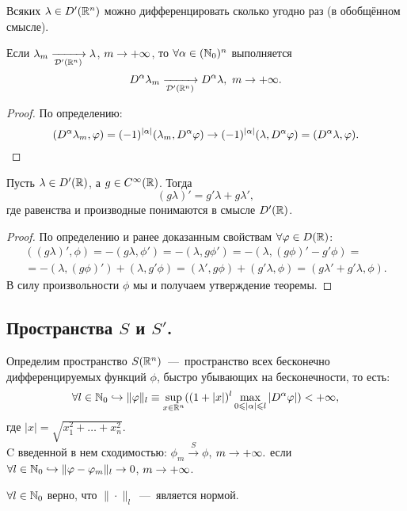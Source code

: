 \begin{note}
    Всяких $\lambda \in D'(\mathbb{R}^n)$ можно дифференцировать сколько угодно раз (в обобщённом смысле).
\end{note}
\begin{lemma}
    Если $\lambda_m \xrightarrow[\mathcal{D}'(\mathbb{R}^n)]{} \lambda$, $m \rightarrow +\infty$, то $\forall \alpha \in (\mathbb{N}_0)^n$ выполняется
    \[
        D^{\alpha} \lambda_m \xrightarrow[\mathcal{D}'(\mathbb{R}^n)]{} D^{\alpha} \lambda,\  m \rightarrow +\infty.
    \]
\end{lemma}
\begin{proof}
    По определению:
    \[
        (D^{\alpha} \lambda_m, \varphi) = (-1)^{|\alpha|} (\lambda_m, D^{\alpha} \varphi) \rightarrow (-1)^{|\alpha|}(\lambda, D^{\alpha}\varphi) = (D^{\alpha} \lambda, \varphi).
    \]
\end{proof}
\begin{theorem}
    Пусть $\lambda \in D'(\mathbb{R})$, а $g \in C^\infty(\mathbb{R})$.
    Тогда
    \[
        (g\lambda)' = g' \lambda + g \lambda',
    \]
    где равенства и производные понимаются в смысле $D'(\mathbb{R})$.
\end{theorem}
\begin{proof}
    По определению и ранее доказанным свойствам $\forall \varphi \in D(\mathbb{R})$:
    \begin{multline*}
        ((g\lambda)', \phi) = -(g \lambda, \phi') = -(\lambda, g \phi') = -(\lambda, (g\phi)' - g'\phi) = \\ = -(\lambda, (g\phi)') + (\lambda, g' \phi) = (\lambda', g\phi) + (g'\lambda, \phi) = (g\lambda' + g'\lambda, \phi).
    \end{multline*}
    В силу произвольности $\phi$ мы и получаем утверждение теоремы.
\end{proof}
\subsection{Пространства $S$ и $S'$.}
\begin{definition}
    Определим пространство $S(\mathbb{R}^n)$~---~пространство всех бесконечно дифференцируемых функций $\phi$, быстро убывающих на бесконечности, то есть:
    \[
        \forall l \in \mathbb{N}_0 \hookrightarrow \|\varphi\|_l \equiv \sup\limits_{x \in \mathbb{R}^n} ((1 + |x|)^l \max\limits_{0 \leqslant |\alpha| \leqslant l} |D^{\alpha} \varphi|) < +\infty,
    \]
    где $|x| = \sqrt{x_1^2 + \ldots + x_n^2}$.\\
    C введенной в нем сходимостью:
    $\phi_m \xrightarrow{S} \phi$, $m \rightarrow +\infty.$
    если $\forall l \in \mathbb{N}_0 \hookrightarrow \|\varphi - \varphi_m\|_l \rightarrow 0$, $m \rightarrow +\infty$.
\end{definition}
\begin{note}
    $\forall l \in \mathbb{N}_0$ верно, что $\|\cdot \|_l$~---~является нормой.
\end{note}

